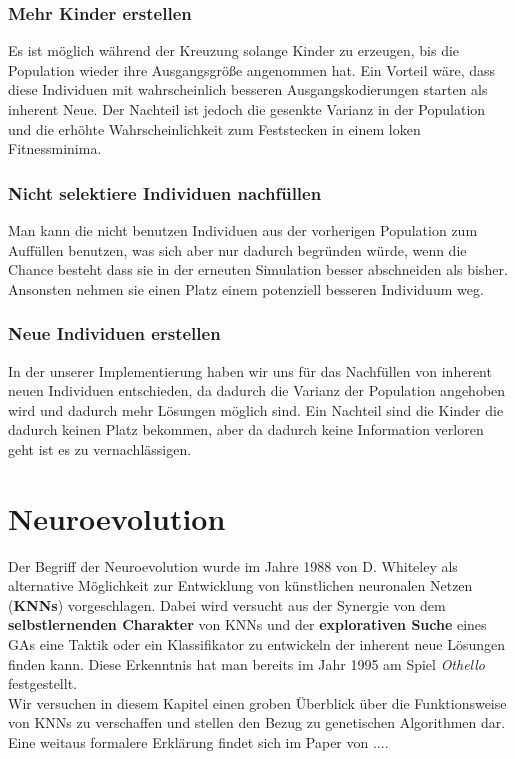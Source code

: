            \subsubsection*{Mehr Kinder erstellen}
                Es ist möglich während der Kreuzung solange Kinder zu erzeugen, bis die Population wieder ihre Ausgangsgröße angenommen hat. Ein Vorteil wäre, dass diese Individuen mit wahrscheinlich besseren Ausgangskodierungen starten als inherent Neue. Der Nachteil ist jedoch die gesenkte Varianz in der Population und die erhöhte Wahrscheinlichkeit zum Feststecken in einem loken Fitnessminima.

            \subsubsection*{Nicht selektiere Individuen nachfüllen}
                Man kann die nicht benutzen Individuen aus der vorherigen Population zum Auffüllen benutzen, was sich aber nur dadurch begründen würde, wenn die Chance besteht dass sie in der erneuten Simulation besser abschneiden als bisher. Ansonsten nehmen sie einen Platz einem potenziell besseren Individuum weg.

            \subsubsection*{Neue Individuen erstellen}
                In der unserer Implementierung haben wir uns für das Nachfüllen von inherent neuen Individuen entschieden, da dadurch die Varianz der Population angehoben wird und dadurch mehr Lösungen möglich sind. Ein Nachteil sind die Kinder die dadurch keinen Platz bekommen, aber da dadurch keine Information verloren geht ist es zu vernachlässigen.

\newpage
    \section{Neuroevolution}
        Der Begriff der Neuroevolution wurde im Jahre 1988 von D. Whiteley\cite{whiteley88} als alternative Möglichkeit zur Entwicklung von künstlichen neuronalen Netzen (\textbf{KNNs}) vorgeschlagen. Dabei wird versucht aus der Synergie von dem \textbf{selbstlernenden Charakter} von KNNs und der \textbf{explorativen Suche} eines GAs eine Taktik oder ein Klassifikator zu entwickeln der inherent neue Lösungen finden kann. Diese Erkenntnis hat man bereits im Jahr 1995 am Spiel \textit{Othello} festgestellt. \cite{othello95} \\[2mm]
        \noindent
        Wir versuchen in diesem Kapitel einen groben Überblick über die Funktionsweise von KNNs zu verschaffen und stellen den Bezug zu genetischen Algorithmen dar. Eine weitaus formalere Erklärung findet sich im Paper von ....

